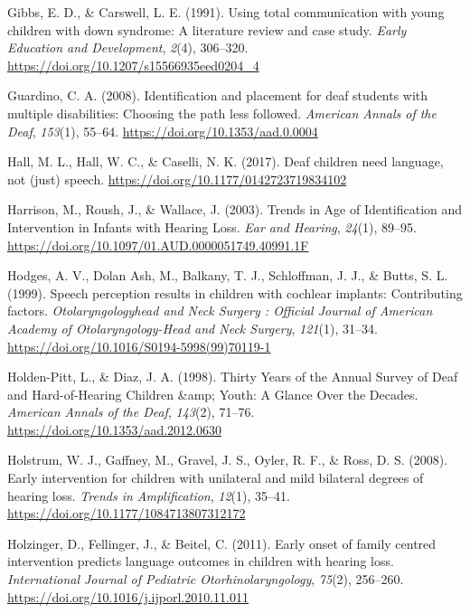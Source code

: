 \documentclass[english,man]{apa6}
\begin{document}
\leavevmode\hypertarget{ref-gibbs1991}{}%
Gibbs, E. D., \& Carswell, L. E. (1991). Using total communication with young children with down syndrome: A literature review and case study. \emph{Early Education and Development}, \emph{2}(4), 306--320. \url{https://doi.org/10.1207/s15566935eed0204_4}

\leavevmode\hypertarget{ref-guardino2008}{}%
Guardino, C. A. (2008). Identification and placement for deaf students with multiple disabilities: Choosing the path less followed. \emph{American Annals of the Deaf}, \emph{153}(1), 55--64. \url{https://doi.org/10.1353/aad.0.0004}

\leavevmode\hypertarget{ref-hall2017}{}%
Hall, M. L., Hall, W. C., \& Caselli, N. K. (2017). Deaf children need language, not (just) speech. \url{https://doi.org/10.1177/0142723719834102}

\leavevmode\hypertarget{ref-harrison2003}{}%
Harrison, M., Roush, J., \& Wallace, J. (2003). Trends in Age of Identification and Intervention in Infants with Hearing Loss. \emph{Ear and Hearing}, \emph{24}(1), 89--95. \url{https://doi.org/10.1097/01.AUD.0000051749.40991.1F}

\leavevmode\hypertarget{ref-hodges1999}{}%
Hodges, A. V., Dolan Ash, M., Balkany, T. J., Schloffman, J. J., \& Butts, S. L. (1999). Speech perception results in children with cochlear implants: Contributing factors. \emph{Otolaryngologyhead and Neck Surgery : Official Journal of American Academy of Otolaryngology-Head and Neck Surgery}, \emph{121}(1), 31--34. \url{https://doi.org/10.1016/S0194-5998(99)70119-1}

\leavevmode\hypertarget{ref-holden-pitt1998}{}%
Holden-Pitt, L., \& Diaz, J. A. (1998). Thirty Years of the Annual Survey of Deaf and Hard-of-Hearing Children \&amp; Youth: A Glance Over the Decades. \emph{American Annals of the Deaf}, \emph{143}(2), 71--76. \url{https://doi.org/10.1353/aad.2012.0630}

\leavevmode\hypertarget{ref-holstrum2008}{}%
Holstrum, W. J., Gaffney, M., Gravel, J. S., Oyler, R. F., \& Ross, D. S. (2008). Early intervention for children with unilateral and mild bilateral degrees of hearing loss. \emph{Trends in Amplification}, \emph{12}(1), 35--41. \url{https://doi.org/10.1177/1084713807312172}

\leavevmode\hypertarget{ref-holzinger2011}{}%
Holzinger, D., Fellinger, J., \& Beitel, C. (2011). Early onset of family centred intervention predicts language outcomes in children with hearing loss. \emph{International Journal of Pediatric Otorhinolaryngology}, \emph{75}(2), 256--260. \url{https://doi.org/10.1016/j.ijporl.2010.11.011}
\end{document}
